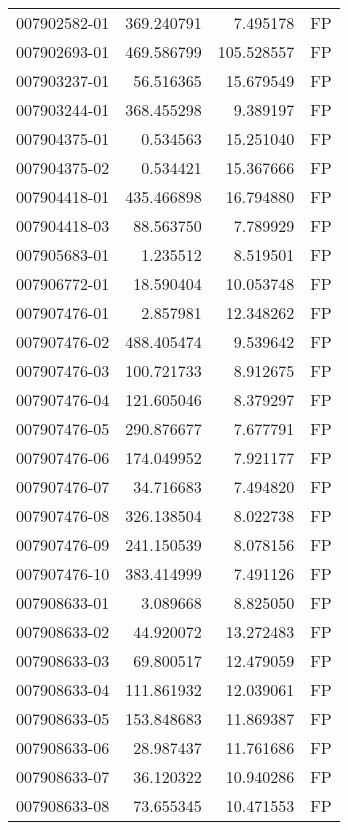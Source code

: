 \begin{tabular}{lrrl}
007902582-01 &  369.240791 &       7.495178 &   FP \\
007902693-01 &  469.586799 &     105.528557 &   FP \\
007903237-01 &   56.516365 &      15.679549 &   FP \\
007903244-01 &  368.455298 &       9.389197 &   FP \\
007904375-01 &    0.534563 &      15.251040 &   FP \\
007904375-02 &    0.534421 &      15.367666 &   FP \\
007904418-01 &  435.466898 &      16.794880 &   FP \\
007904418-03 &   88.563750 &       7.789929 &   FP \\
007905683-01 &    1.235512 &       8.519501 &   FP \\
007906772-01 &   18.590404 &      10.053748 &   FP \\
007907476-01 &    2.857981 &      12.348262 &   FP \\
007907476-02 &  488.405474 &       9.539642 &   FP \\
007907476-03 &  100.721733 &       8.912675 &   FP \\
007907476-04 &  121.605046 &       8.379297 &   FP \\
007907476-05 &  290.876677 &       7.677791 &   FP \\
007907476-06 &  174.049952 &       7.921177 &   FP \\
007907476-07 &   34.716683 &       7.494820 &   FP \\
007907476-08 &  326.138504 &       8.022738 &   FP \\
007907476-09 &  241.150539 &       8.078156 &   FP \\
007907476-10 &  383.414999 &       7.491126 &   FP \\
007908633-01 &    3.089668 &       8.825050 &   FP \\
007908633-02 &   44.920072 &      13.272483 &   FP \\
007908633-03 &   69.800517 &      12.479059 &   FP \\
007908633-04 &  111.861932 &      12.039061 &   FP \\
007908633-05 &  153.848683 &      11.869387 &   FP \\
007908633-06 &   28.987437 &      11.761686 &   FP \\
007908633-07 &   36.120322 &      10.940286 &   FP \\
007908633-08 &   73.655345 &      10.471553 &   FP \\

\end{tabular}
